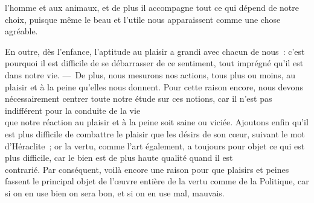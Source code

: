 \documentclass[french,twoside]{book} %
\begin{document}
l’homme et aux animaux, et de plus il accompagne tout ce qui dépend de notre choix, puisque même le beau et l’utile nous  apparaissent comme une chose agréable.\par
En outre, dès l’enfance, l’aptitude au plaisir a grandi avec chacun de nous : c’est pourquoi il est difficile de se débarrasser de ce sentiment, tout imprégné qu’il est dans notre vie. — De plus, nous mesurons nos actions, tous plus ou moins, au plaisir et à la peine qu’elles nous donnent. Pour cette raison encore, nous devons nécessairement centrer toute notre étude sur ces notions, car il n’est pas indifférent pour la conduite de la vie \\
que notre réaction au plaisir et à la peine soit saine ou viciée. Ajoutons enfin qu’il est plus difficile de combattre le plaisir que les désirs de son cœur, suivant le mot d’Héraclite ; or la vertu, comme l’art également, a toujours pour objet ce qui est plus difficile, car le bien est de plus haute qualité quand il est \\
contrarié. Par conséquent, voilà encore une raison pour que plaisirs et peines fassent le principal objet de l’œuvre entière de la vertu comme de la Politique, car si on en use bien on sera bon, et si on en use mal, mauvais.
\end{document}
